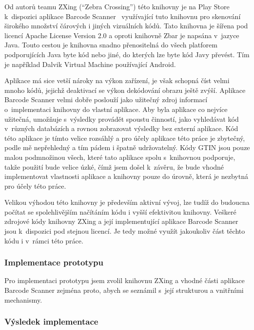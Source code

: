 \documentclass[thesis=B,czech]{FITthesis}[2013/10/20]
\begin{document}
Od autorů teamu ZXing (``Zebra Crossing'') této knihovny je na Play Store k~dispozici aplikace Barcode Scanner~\cite{barcode_scanner} využívající tuto knihovnu pro skenování širokého množství čárových i jiných vizuálních kódů. Tato knihovna je šířena pod licencí Apache License Version 2.0 a oproti knihovně Zbar je napsána v~jazyce Java. Touto cestou je knihovna snadno přenositelná do všech platforem podporujících Java byte kód nebo jiné, do kterých lze byte kód Javy převést. Tím je například Dalvik Virtual Machine používající Android.

Aplikace má sice vetší nároky na výkon zařízení, je však schopná číst velmi mnoho kódů, jejichž deaktivací se výkon dekódování obrazu ještě zvýší. Aplikace Barcode Scanner velmi dobře poslouží jako užitečný zdroj informací o~implementaci knihovny do vlastní aplikace. Aby byla aplikace co nejvíce užitečná, umožňuje s~výsledky provádět spoustu činností, jako vyhledávat kód v~různých databázích a rovnou zobrazovat výsledky bez externí aplikace. Kód této aplikace je tímto velice rozsáhlý a pro účely aplikace této práce je zbytečný, podle mě nepřehledný a tím pádem i špatně udržovatelný. Kódy GTIN jsou pouze malou podmnožinou všech, které tato aplikace spolu s~knihovnou podporuje, takže použití bude velice úzké, čímž jsem došel k~závěru, že bude vhodné implementovat vlastnosti aplikace a knihovny pouze do úrovně, která je nezbytná pro účely této práce.

Velikou výhodou této knihovny je především aktivní vývoj, lze tudíž do budoucna počítat se spolehlivějším načítáním kódu i vyšší efektivitou knihovny. Veškeré zdrojové kódy knihovny ZXing a její implementující aplikace Barcode Scanner jsou k~dispozici pod stejnou licencí. Je tedy možné využít jakoukoliv část těchto kódu i v~rámci této práce. 

\subsubsection{Implementace prototypu}

Pro implementaci prototypu jsem zvolil knihovnu ZXing a vhodné části aplikace Barcode Scanner zejména proto, abych se seznámil s~její strukturou a vnitřními mechanismy. 

\subsubsection{Výsledek implementace}
\end{document}
